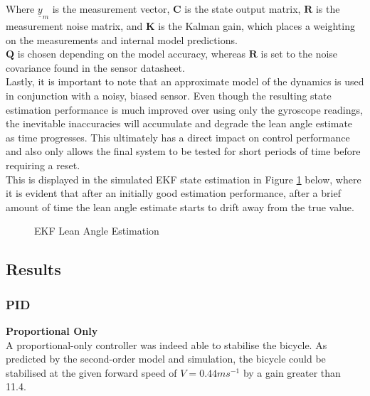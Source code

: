 Where $\underline{y}_m$ is the measurement vector, $\mathbf{C}$ is the state output matrix, $\mathbf{R}$ is the measurement noise matrix, and $\mathbf{K}$ is the Kalman gain, which places a weighting on the measurements and internal model predictions. \\
$\mathbf{Q}$ is chosen depending on the model accuracy, whereas $\mathbf{R}$ is set to the noise covariance found in the sensor datasheet. \\

Lastly, it is important to note that an approximate model of the dynamics is used in conjunction with a noisy, biased sensor. Even though the resulting state estimation performance is much improved over using only the gyroscope readings, the inevitable inaccuracies will accumulate and degrade the lean angle estimate as time progresses. This ultimately has a direct impact on control performance and also only allows the final system to be tested for short periods of time before requiring a reset. \\

This is displayed in the simulated EKF state estimation in Figure \ref{fig:LegoKalman} below, where it is evident that after an initially good estimation performance, after a brief amount of time the lean angle estimate starts to drift away from the true value.

\begin{figure}[H]
	\centering
	\caption{EKF Lean Angle Estimation}
	\label{fig:LegoKalman}
\end{figure}

\subsection{Results}

\subsubsection{PID}
\textbf{Proportional Only} \\
A proportional-only controller was indeed able to stabilise the bicycle. As predicted by the second-order model and simulation, the bicycle could be stabilised at the given forward speed of $V=0.44ms^{-1}$ by a gain greater than 11.4. \\

